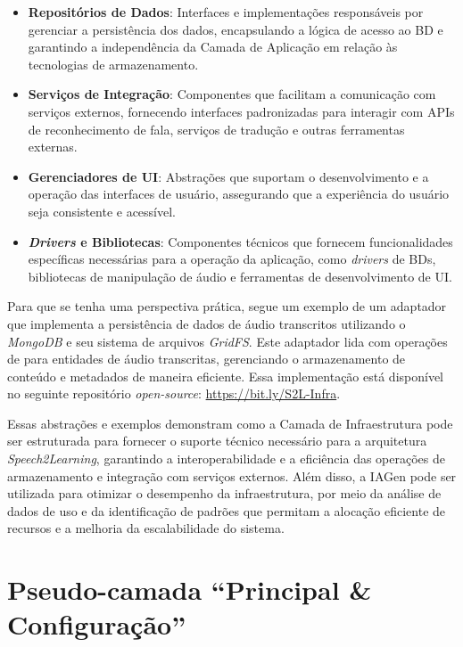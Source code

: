 \begin{itemize}
    \item \textbf{Repositórios de Dados}: Interfaces e implementações responsáveis por gerenciar a persistência dos dados, encapsulando a lógica de acesso ao BD e garantindo a independência da Camada de Aplicação em relação às tecnologias de armazenamento.

    \item \textbf{Serviços de Integração}: Componentes que facilitam a comunicação com serviços externos, fornecendo interfaces padronizadas para interagir com APIs de reconhecimento de fala, serviços de tradução e outras ferramentas externas.

    \item \textbf{Gerenciadores de UI}: Abstrações que suportam o desenvolvimento e a operação das interfaces de usuário, assegurando que a experiência do usuário seja consistente e acessível.

    \item \textbf{\textit{Drivers} e Bibliotecas}: Componentes técnicos que fornecem funcionalidades específicas necessárias para a operação da aplicação, como \textit{drivers} de BDs, bibliotecas de manipulação de áudio e ferramentas de desenvolvimento de UI.
\end{itemize}

Para que se tenha uma perspectiva prática, segue um exemplo de um adaptador que implementa a persistência de dados de áudio transcritos utilizando o \textit{MongoDB} e seu sistema de arquivos \textit{GridFS}. Este adaptador lida com operações de  para entidades de áudio transcritas, gerenciando o armazenamento de conteúdo e metadados de maneira eficiente. Essa implementação está disponível no seguinte repositório \textit{open-source}: \url{https://bit.ly/S2L-Infra}.

Essas abstrações e exemplos demonstram como a Camada de Infraestrutura pode ser estruturada para fornecer o suporte técnico necessário para a arquitetura \textit{Speech2Learning}, garantindo a interoperabilidade e a eficiência das operações de armazenamento e integração com serviços externos. Além disso, a IAGen pode ser utilizada para otimizar o desempenho da infraestrutura, por meio da análise de dados de uso e da identificação de padrões que permitam a alocação eficiente de recursos e a melhoria da escalabilidade do sistema.

\section{Pseudo-camada ``Principal \& Configuração''}

